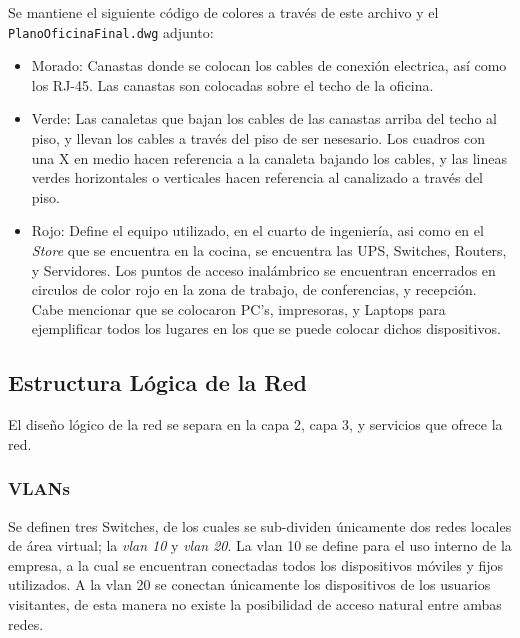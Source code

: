         Se mantiene el siguiente código de colores a través de
        este archivo y el \verb|PlanoOficinaFinal.dwg| adjunto:

        \begin{itemize}
            \item Morado: Canastas donde se colocan los cables de
                conexión electrica, así como los RJ-45. Las canastas
                son colocadas sobre el techo de la oficina.
            \item Verde: Las canaletas que bajan los cables de
                las canastas arriba del techo al piso, y llevan
                los cables a través del piso de ser nesesario.
                Los cuadros con una X en medio hacen referencia a
                la canaleta bajando los cables, y las lineas verdes
                horizontales o verticales hacen referencia al
                canalizado a través del piso. 
            \item Rojo: Define el equipo utilizado, en el cuarto
                de ingeniería, asi como en el {\it Store} que se
                encuentra en la cocina, se encuentra las UPS,
                Switches, Routers, y Servidores. Los puntos de
                acceso inalámbrico se encuentran encerrados en
                circulos de color rojo en la zona de trabajo, 
                de conferencias, y recepción. Cabe mencionar que
                se colocaron PC's, impresoras, y Laptops para
                ejemplificar todos los lugares en los que se 
                puede colocar dichos dispositivos.
        \end{itemize}

    \subsection{Estructura Lógica de la Red}
       
        El diseño lógico de la red se separa en la capa 2,
        capa 3, y servicios que ofrece la red.

        \subsubsection{VLANs}

            Se definen tres Switches, de los cuales se sub-dividen
            únicamente dos redes locales de área virtual; la 
            {\it vlan 10} y {\it vlan 20}. La vlan 10 se define
            para el uso interno de la empresa, a la cual se encuentran
            conectadas todos los dispositivos móviles y fijos 
            utilizados. A la vlan 20 se conectan únicamente los
            dispositivos de los usuarios visitantes, de esta manera
            no existe la posibilidad de acceso natural entre
            ambas redes.

